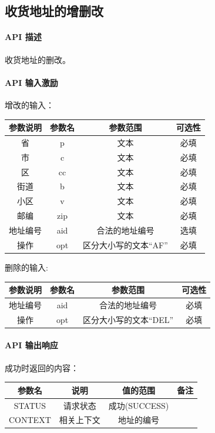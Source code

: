\documentclass[UTF8]{article}
\def\apiintr{\paragraph{\colorbox[rgb]{1.0,0.6,0.65}{API 描述}}} %
\def\apiexc{\paragraph{\colorbox[rgb]{1,0.85,0.45}{API 输入激励}}} %
\def\apiresp{\paragraph{\colorbox[rgb]{0.9,0.9,1}{API 输出响应}}} %
\def\成功{\colorbox[rgb]{0.4,1,0.5}{成功}}
\def\成功V{成功(SUCCESS)}
\begin{document}
    \subsection{收货地址的增删改}
    \apiintr
    收货地址的删改。
    \apiexc
    增改的输入：\\
    \begin{tabular}{|c|c|c|c|}
        \hline \rule[-2ex]{0pt}{5.5ex} 参数说明 & 参数名 & 参数范围 & 可选性 \\
        \hline \rule[-2ex]{0pt}{5.5ex} 省 & p & 文本 & 必填 \\
        \hline \rule[-2ex]{0pt}{5.5ex} 市 & c & 文本 & 必填 \\
        \hline \rule[-2ex]{0pt}{5.5ex} 区 & cc & 文本 & 必填 \\
        \hline \rule[-2ex]{0pt}{5.5ex} 街道 & b & 文本 & 必填 \\
        \hline \rule[-2ex]{0pt}{5.5ex} 小区 & v & 文本 & 必填 \\
        \hline \rule[-2ex]{0pt}{5.5ex} 邮编 & zip & 文本 & 必填 \\
        \hline \rule[-2ex]{0pt}{5.5ex} 地址编号 & aid & 合法的地址编号 & 选填 \\
        \hline \rule[-2ex]{0pt}{5.5ex} 操作 & opt & 区分大小写的文本“AF” & 必填 \\
        \hline 
    \end{tabular}
    \par 删除的输入:\\
    \begin{tabular}{|c|c|c|c|}
        \hline \rule[-2ex]{0pt}{5.5ex} 参数说明 & 参数名 & 参数范围 & 可选性 \\
        \hline \rule[-2ex]{0pt}{5.5ex} 地址编号 & aid & 合法的地址编号 & 必填 \\
        \hline \rule[-2ex]{0pt}{5.5ex} 操作 & opt & 区分大小写的文本“DEL” & 必填 \\
        \hline 
    \end{tabular}
    \apiresp
    \成功 时返回的内容：\\
    \begin{tabular}{|c|c|c|c|}
        \hline \rule[-2ex]{0pt}{5.5ex} 参数名 & 说明 & 值的范围 & 备注 \\
        \hline \rule[-2ex]{0pt}{5.5ex} STATUS & 请求状态 & \成功V &  \\ 
        \hline \rule[-2ex]{0pt}{5.5ex} CONTEXT & 相关上下文 & 地址的编号 &  \\
        \hline 
    \end{tabular} 
\end{document}
